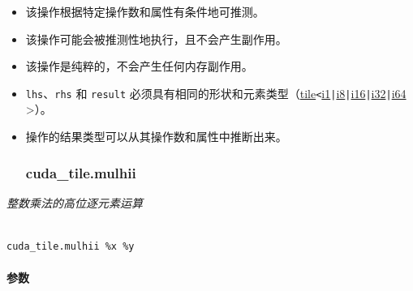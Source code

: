 \documentclass{article}
\begin{document}
\begin{itemize}
\item 该操作根据特定操作数和属性有条件地可推测。
\item 该操作可能会被推测性地执行，且不会产生副作用。
\item 该操作是纯粹的，不会产生任何内存副作用。
\item \texttt{lhs}、\texttt{rhs} 和 \texttt{result} 必须具有相同的形状和元素类型（\href{https://docs.nvidia.com/cuda/tile-ir/latest/sections/types.html#type-tile}{tile}\texttt{<}\href{https://docs.nvidia.com/cuda/tile-ir/latest/sections/types.html#subsection-element-types}{i1}\texttt{|}\href{https://docs.nvidia.com/cuda/tile-ir/latest/sections/types.html#subsection-element-types}{i8}\texttt{|}\href{https://docs.nvidia.com/cuda/tile-ir/latest/sections/types.html#subsection-element-types}{i16}\texttt{|}\href{https://docs.nvidia.com/cuda/tile-ir/latest/sections/types.html#subsection-element-types}{i32}\texttt{|}\href{https://docs.nvidia.com/cuda/tile-ir/latest/sections/types.html#subsection-element-types}{i64} >）。
\item 操作的结果类型可以从其操作数和属性中推断出来。




\subsubsection{cuda\_tile.mulhii}


\end{itemize}
\textit{整数乘法的高位逐元素运算}



\begin{lstlisting}

cuda_tile.mulhii %x %y

\end{lstlisting}



\paragraph{参数}
\end{document}
